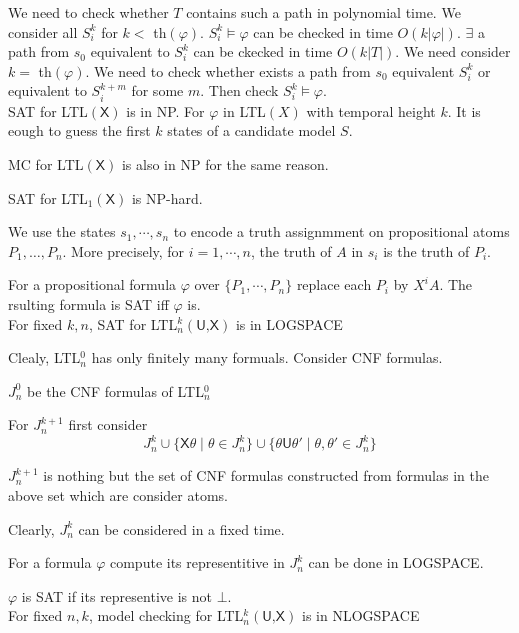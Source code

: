 \documentclass[12pt]{article}
\begin{document}
\begin{CJK*}{GBK}{song}
We need to check whether $T$ contains such a path in polynomial time. We consider all $S^k_i$ for $k<$ th$(\varphi)$. $S^k_i\models \varphi$ can be checked in time $O(k|\varphi|)$. $\exists $ a path from $s_0$ equivalent to $S^k_i$ can be ckecked in time $O(k|T|)$. We need consider $k=$ th$(\varphi)$. We need to check whether exists a path from $s_0$ equivalent $S^k_i$ or equivalent to $S^{k+m}_i$ for some $m$. Then check $S^k_i\models\varphi$.\\



SAT for LTL$(\textsf{X})$ is in NP. For $\varphi$ in LTL$(X)$ with temporal height $k$.  It is eough to guess the first $k$ states of a candidate model $S$.

MC for LTL$(\textsf{X})$ is also in NP for the same reason.


SAT for LTL$_1(\textsf{X})$ is NP-hard.

We use the states $s_1,\cdots, s_n$ to encode a truth assignmment on propositional atoms $P_1,\dots, P_n$. More precisely, for $i=1,\cdots, n$, the truth of $A$ in $s_i$ is the truth of $P_i$.

For a propositional formula $\varphi$ over $\{P_1,\cdots, P_n\}$ replace each $P_i$ by $X^iA$. The rsulting formula is SAT iff $\varphi$ is.\\




For fixed $k,n$, SAT for LTL$_n^k(\textsf{U,X})$ is in LOGSPACE

Clealy, LTL$^0_n$ has only finitely many formuals. Consider CNF formulas.

$J_n^0$ be the CNF formulas of LTL$^0_n$

For $J_n^{k+1}$ first consider
%
$$J_n^k\cup\{\textsf{X}\theta\mid \theta\in J_n^k\}\cup\{\theta\textsf{U}\theta'\mid \theta,\theta'\in J^k_n\}$$

$J_n^{k+1}$ is nothing but the set of CNF formulas constructed from formulas in the above set which are consider atoms.


Clearly, $J_n^k$ can be considered in a fixed time.

For a formula $\varphi$ compute its representitive in $J^k_n$ can be done in LOGSPACE.


$\varphi$ is SAT if its representive is not $\bot$.
\\


For fixed $n,k$, model checking for LTL$_n^k(\textsf{U,X})$ is in NLOGSPACE



\end{CJK*}
\end{document}
